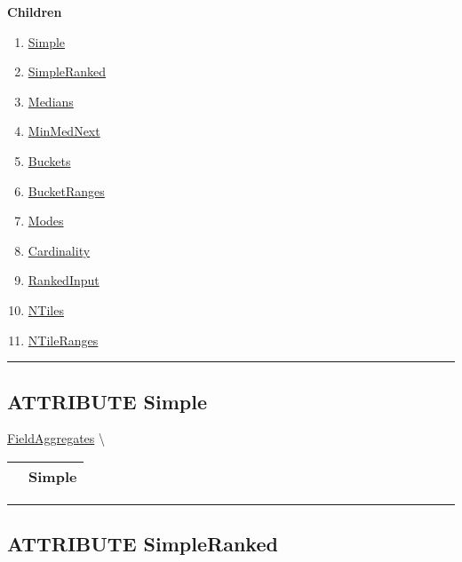 \textbf{Children}
\begin{enumerate}
\item \hyperlink{ecldoc:ml_core.fieldaggregates.simple}{Simple}
\item \hyperlink{ecldoc:ml_core.fieldaggregates.simpleranked}{SimpleRanked}
\item \hyperlink{ecldoc:ml_core.fieldaggregates.medians}{Medians}
\item \hyperlink{ecldoc:ml_core.fieldaggregates.minmednext}{MinMedNext}
\item \hyperlink{ecldoc:ml_core.fieldaggregates.buckets}{Buckets}
\item \hyperlink{ecldoc:ml_core.fieldaggregates.bucketranges}{BucketRanges}
\item \hyperlink{ecldoc:ml_core.fieldaggregates.modes}{Modes}
\item \hyperlink{ecldoc:ml_core.fieldaggregates.cardinality}{Cardinality}
\item \hyperlink{ecldoc:ml_core.fieldaggregates.rankedinput}{RankedInput}
\item \hyperlink{ecldoc:ml_core.fieldaggregates.ntiles}{NTiles}
\item \hyperlink{ecldoc:ml_core.fieldaggregates.ntileranges}{NTileRanges}
\end{enumerate}

\rule{\linewidth}{0.5pt}

\subsection*{\textsf{\colorbox{headtoc}{\color{white} ATTRIBUTE}
Simple}}

\hypertarget{ecldoc:ml_core.fieldaggregates.simple}{}
\hspace{0pt} \hyperlink{ecldoc:ml_core.fieldaggregates}{FieldAggregates} \textbackslash 

{\renewcommand{\arraystretch}{1.5}
\begin{tabularx}{\textwidth}{|>{\raggedright\arraybackslash}l|X|}
\hline
\hspace{0pt}\mytexttt{\color{red} } & \textbf{Simple} \\
\hline
\end{tabularx}
}

\par


\rule{\linewidth}{0.5pt}
\subsection*{\textsf{\colorbox{headtoc}{\color{white} ATTRIBUTE}
SimpleRanked}}

